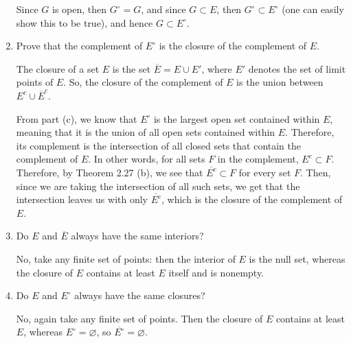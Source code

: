 \documentclass[10pt]{article}
\begin{document}
\begin{problem}
\begin{enumerate}[label=\alph*)]
				\begin{solution}
					Since \( G \) is open, then \( G^{\circ} = G \), and since \( G \subset E \), then 
					\( G^{\circ} \subset E^{\circ} \) (one can easily show this to be true), 
					and hence \( G \subset E^{\circ} \). 
				\end{solution}
			\item Prove that the complement of \( E^{\circ} \) is the closure of the complement of \( E \). 

				\begin{solution}
					The closure of a set \( E \) is the set \( \overline E = E \cup E' \), where \( E' \) 
					denotes the set of limit points of \( E \). So, the closure 
					of the complement of \( E \) is the union between \( E^{c} \cup \overline E^{c} \).  

					From part (c), we know that \( E^{\circ} \) is the largest open set contained within 
					\( E \), meaning 
					that it is the union of all open sets contained within \( E \). Therefore, its complement 
					is the intersection of all closed sets that contain the complement of \( E \). In other words, 
					for all sets \( F \) in the complement, \( E^{c} \subset F \). Therefore, by Theorem 
					2.27 (b), we see that \( \overline {E^{c}} \subset F \) for every set \( F \). Then, since 
					we are taking the intersection of all such sets, we get that the intersection leaves us 
					with only \( \overline{E^{c}} \), which is the closure of the complement of \( E \). 
				\end{solution}
			\item Do \( E \) and \( \overline E \) always have the same interiors?

				\begin{solution}
					No, take any finite set of points: then the interior of \( E \) is the null set, whereas
					the closure of \( E \) contains at least \( E \) itself and is nonempty.
				\end{solution}
			\item Do  \( E \) and \( E^{\circ} \) always have the same closures? 

				\begin{solution}
					No, again take any finite set of points. Then the closure of \( E \) contains at least \( E \), 
					whereas \( E^{\circ} = \varnothing\), so \( \overline{E^{\circ}} = \varnothing \). 
				\end{solution}
		\end{enumerate}
	\end{problem}
\end{document}
